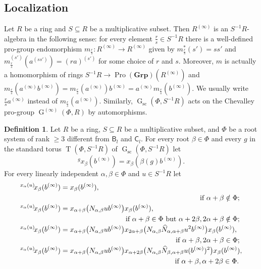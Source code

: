 \documentclass{article}
\numberwithin{equation}{section}
\theoremstyle{definition}
\newtheorem{df}[lemma]{Definition} \Crefname{df}{Definition}{Definitions}
\theoremstyle{remark}
\DeclareMathOperator\GG{G}
\DeclareMathOperator\Torus{T}
\DeclareMathOperator{\Pro}{Pro}
\newcommand{\Group}{\mathbf{Grp}}
\newcommand{\up}[2]{{^{#1}\!{#2}}}
\newcommand{\rB}{\mathsf{B}}
\newcommand{\rC}{\mathsf{C}}
\begin{document}
\subsection{Localization}

Let \(R\) be a ring and \(S \subseteq R\) be a multiplicative subset. Then \(R^{(\infty)}\) is an \(S^{-1} R\)-algebra in the following sense: for every element \(\frac rs \in S^{-1} R\) there is a well-defined pro-group endomorphism \(m_{\frac rs} \colon R^{(\infty)} \to R^{(\infty)}\) given by \(m_{\frac rs}^*(s') = ss'\) and \(m_{\frac rs}^{(s')}(a^{(ss')}) = (ra)^{(s')}\) for some choice of \(r\) and \(s\). Moreover, \(m\) is actually a homomorphism of rings \(S^{-1} R \to \Pro(\Group)(R^{(\infty)})\) and \(m_{\frac rs}(a^{(\infty)} b^{(\infty)}) = m_{\frac rs}(a^{(\infty)}) b^{(\infty)} = a^{(\infty)} m_{\frac rs}(b^{(\infty)})\). We usually write \(\frac rs a^{(\infty)}\) instead of \(m_{\frac rs}(a^{(\infty)})\). Similarly, \(\GG_{\mathrm{sc}}(\Phi, S^{-1} R)\) acts on the Chevalley pro-group \(\GG^{(\infty)}(\Phi, R)\) by automorphisms.

\begin{df}\label{root-action}
 Let \(R\) be a ring, \(S \subseteq R\) be a multiplicative subset, and \(\Phi\) be a root system of rank \(\geq 3\) different from \(\rB_l\) and \(\rC_l\). For every root \(\beta \in \Phi\) and every \(g\) in the standard torus \(\Torus(\Phi, S^{-1} R)\) of \(\GG_{\mathrm{sc}}(\Phi, S^{-1} R)\) let
 \[\up g{x_\beta(b^{(\infty)})} = x_\beta(\beta(g) b^{(\infty)}).\]
 For every linearly independent \(\alpha, \beta \in \Phi\) and \(u \in S^{-1} R\) let
 \begin{align*}
 \up{x_\alpha(u)}{x_\beta(b^{(\infty)})}
 &= x_\beta(b^{(\infty)}), \\
 \multispan2{\hfil if $\alpha + \beta \notin \Phi$;} \\
 \up{x_\alpha(u)}{x_\beta(b^{(\infty)})}
 &= x_{\alpha + \beta}\bigl(N_{\alpha, \beta} u b^{(\infty)}\bigr)
  x_\beta(b^{(\infty)}), \\
 \multispan2{\hfill if $\alpha + \beta \in \Phi$ but $\alpha + 2\beta, 2\alpha + \beta \notin \Phi$;} \\
 \up{x_\alpha(u)}{x_\beta(b^{(\infty)})}
 &= x_{\alpha + \beta}\bigl(N_{\alpha, \beta} u b^{(\infty)}\bigr)
  x_{2\alpha + \beta}\bigl(N_{\alpha, \beta} \widehat N_{\alpha, \alpha + \beta} u^2 b^{(\infty)}\bigr)
  x_\beta(b^{(\infty)}), \\
 \multispan2{\hfill if $\alpha + \beta, 2\alpha + \beta \in \Phi$;} \\
 \up{x_\alpha(u)}{x_\beta(b^{(\infty)})}
 &= x_{\alpha + \beta}\bigl(N_{\alpha, \beta} u b^{(\infty)}\bigr)
  x_{\alpha + 2\beta}\bigl(N_{\alpha, \beta} \widehat N_{\beta, \alpha + \beta} u (b^{(\infty)})^2\bigr)
  x_\beta(b^{(\infty)}), \\
 \multispan2{\hfill if $\alpha + \beta, \alpha + 2\beta \in \Phi$.}
 \end{align*} 
\end{df}
\end{document}
